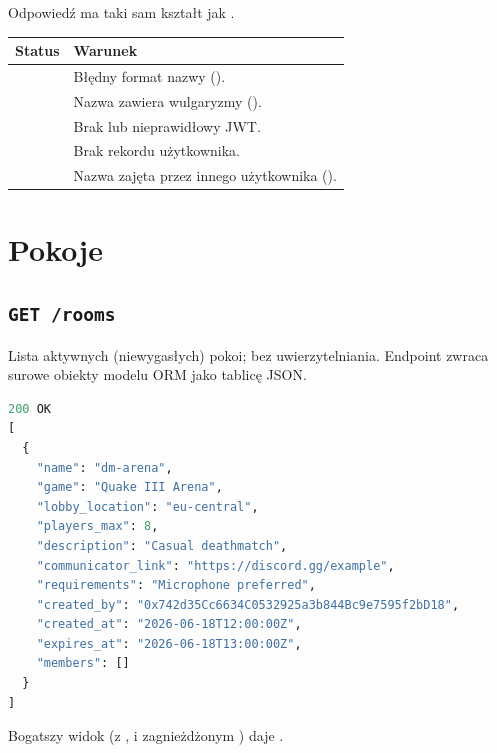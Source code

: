 Odpowiedź  ma taki sam kształt jak .

\begin{tabularx}{\textwidth}{lY}
\toprule
Status & Warunek \\
\midrule
{} & Błędny format nazwy (). \\
 & Nazwa zawiera wulgaryzmy (). \\
 & Brak lub nieprawidłowy JWT. \\
 & Brak rekordu użytkownika. \\
 & Nazwa zajęta przez innego użytkownika (). \\
\bottomrule
\end{tabularx}

\section{Pokoje}
\label{sec:api-rooms}

\subsection{\texttt{GET /rooms}}

Lista aktywnych (niewygasłych) pokoi; bez uwierzytelniania. Endpoint zwraca surowe obiekty modelu ORM
 jako tablicę JSON.

\begin{lstlisting}[language=Python]
200 OK
[
  {
    "name": "dm-arena",
    "game": "Quake III Arena",
    "lobby_location": "eu-central",
    "players_max": 8,
    "description": "Casual deathmatch",
    "communicator_link": "https://discord.gg/example",
    "requirements": "Microphone preferred",
    "created_by": "0x742d35Cc6634C0532925a3b844Bc9e7595f2bD18",
    "created_at": "2026-06-18T12:00:00Z",
    "expires_at": "2026-06-18T13:00:00Z",
    "members": []
  }
]
\end{lstlisting}

Bogatszy widok (z ,  i zagnieżdżonym ) daje
.

